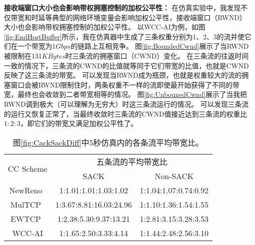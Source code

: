 \documentclass[winfonts]{njuthesis}
\begin{document}
\textbf{接收端窗口大小也会影响带权拥塞控制的加权公平性：}
在仿真实验中，我发现不仅带宽和时延等典型的网络环境变量会影响加权公平性，接收端窗口（RWND）大小也会影响带权拥塞控制的加权公平性。
以WCC-AI为例，如图\ref{fig:EndHostBuffer}所示，我在仿真器中生成了三条权重分别为1、2、3的流并使它们在一个带宽为1$Gbps$的链路上互相竞争。
图\ref{fig:BoundedCwnd}展示了当RWND被限制在131$KBytes$时三条流的拥塞窗口（CWND）变化。
在三条流的往返时间一致的情况下，三条流的CWND的比值就等同于它们带宽的比值，也就是CWND反映了这三条流的带宽。
可以发现当RWND成为瓶颈，也就是权重较大的流的拥塞窗口会被RWND限制住时，两条权重不一样的流即使最开始获得了不同的带宽，最终也会收敛到二者带宽相等的情况。
图\ref{fig:UnbounedCwnd}展示了当我把RWND调到极大（可以理解为无穷大）时这三条流运行的情况。
可以发现三条流的运行又恢复正常了，当最终收敛时三条流的CWND值接近达到三条流的权重比$1:2:3$，即它们的带宽又满足加权公平性了。

\begin{table}[h]
	\caption{图\ref{fig:CackSackDiff}中5秒仿真内的各条流平均带宽比。}
	\label{tab:CackSackDiff}
	\centering
	\begin{tabular}{c|cc}
		\hline
		\multirow{2}{*}{CC Scheme} & \multicolumn{2}{c}{五条流的平均带宽比} \\
		\cline{2-3} & SACK & Non-SACK \\
		\hline
		NewReno~\cite{Henderson2012NewReno} & 1:1.01:1.01:1.03:1.02 & 1:1.04:1.07:0.74:0.92 \\
		MulTCP~\cite{crowcroft1998differentiated} & 1:3.67:8.81:16.03:24.96 & 1:1.10:1.36:1.54:1.55 \\
		EWTCP~\cite{Honda2009EWTCP} & 1:2.38:5.30:9.37:13.21 & 1:2.81:3.15:3.28:3.53\\
		WCC-AI & 1:1.65:2.50:3.33:4.14 & 1:1.44:2.48:2.56:3.10\\
		\hline
	\end{tabular}
\end{table}
\end{document}
